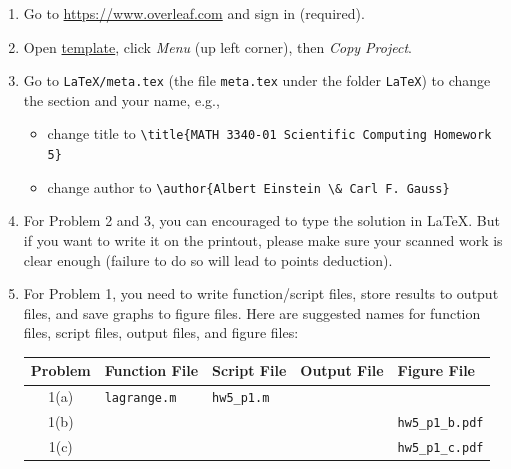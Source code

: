 \begin{enumerate}[label={\arabic*.}]
  \item Go to \url{https://www.overleaf.com} and sign in (required).
  \item Open \href{https://www.overleaf.com/read/qdhgzdjpwbhj}{template}, click \emph{Menu} (up left corner), then \emph{Copy Project}.
  \item Go to \verb|LaTeX/meta.tex| (the file \verb|meta.tex| under the folder \verb|LaTeX|) to change the section and your name, e.g.,
    \begin{itemize}
      \item change title to \verb|\title{MATH 3340-01 Scientific Computing Homework 5}|
      \item change author to \verb|\author{Albert Einstein \& Carl F. Gauss}|
    \end{itemize}
  \item For Problem 2 and 3, you can encouraged to type the solution in \LaTeX{}. But if you want to write it on the printout, please make sure your scanned work is clear enough (failure to do so will lead to points deduction).
  \item For Problem 1, you need to write function/script files, store results to output files, and save graphs to figure files. Here are suggested names for function files, script files, output files, and figure files:
    \begin{table}[!hbtp]
      \centering
      \begin{tabular}{cllll}
        \toprule
        Problem     & Function File     & Script File     & Output File       & Figure File         \\
        \midrule
        1(a)        & \verb|lagrange.m| & \verb|hw5_p1.m| &                   &                     \\
        1(b)        &                   &                 &                   & \verb|hw5_p1_b.pdf| \\
        1(c)        &                   &                 &                   & \verb|hw5_p1_c.pdf| \\
        \bottomrule
      \end{tabular}
    \end{table}


\end{enumerate}
